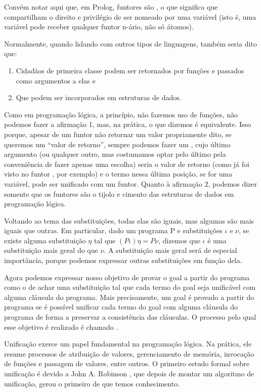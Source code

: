   Convém notar aqui que, em Prolog, funtores são , o que significa que compartilham o
  direito e privilégio de ser nomeado por uma variável (isto é, uma variável pode receber qualquer funtor n-ário, não só átomos).

  Normalmente, quando lidando com outros tipos de linguagens, também seria dito que:

  \begin{enumerate}
    \item Cidadãos de primeira classe podem ser retornados por funções e passados como argumentos a elas e
    \item Que podem ser incorporados em estruturas de dados.
  \end{enumerate}

  Como em programação lógica, a princípio, não fazemos uso de funções, não podemos fazer a afirmação 1, mas, na prática, o que dizemos é equivalente.
  Isso porque, apesar de um funtor  não retornar um valor propriamente dito, se queremos um ``valor de retorno'', sempre podemos
  fazer um , cujo último argumento (ou qualquer outro, mas costumamos optar pelo último pela conveniência de fazer apenas uma
  escolha) seria o valor de retorno (como já foi visto no funtor , por exemplo) e o termo nessa última posição, se for uma variável, pode ser unificado com um funtor. Quanto à afirmação 2, podemos dizer somente que os funtores são o tijolo e cimento das
  estruturas de dados em programação lógica.

Voltando ao tema das substituições, todas elas são iguais, mas algumas são mais iguais que outras. Em particular, dado um programa P e substituições $\iota$ e $\nu$, se existe alguma substituição $\eta$ tal que $(P\iota)\eta = P \nu$, dizemos que $\iota$ é uma substituição mais geral do que $\nu$. A substituição mais geral será de especial importância, porque podemos expressar outras substituições em função dela.

Agora podemos expressar nosso objetivo de provar o goal a partir do programa como o de achar uma substituição tal que cada termo do goal seja unificável com alguma cláusula do programa. Mais precisamente, um goal é provado a partir do programa se é possível unificar cada termo do goal com alguma cláusula do programa de forma a preservar a consistência das cláusulas. O processo pelo qual esse objetivo é realizado é chamado .

Unificação exerce um papel fundamental na programação lógica. Na prática, ele resume processos de atribuição de valores, gerenciamento de memória, invocação de funções e passagem de valores, entre outros. O primeiro estudo formal sobre unificação é devido a John A. Robinson \cite{robinson}, que depois de montar um algoritmo de unificação, gerou o primeiro de que temos conhecimento.

